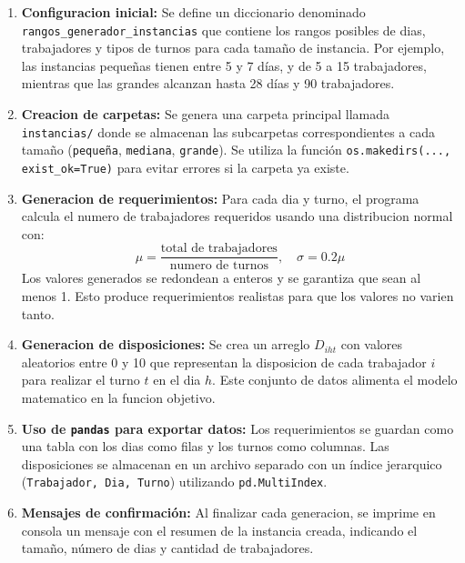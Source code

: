 \documentclass{article}
\begin{document}
\begin{enumerate}
    \item \textbf{Configuracion inicial:} 
    Se define un diccionario denominado \texttt{rangos\_generador\_instancias} que contiene los rangos posibles de dias, trabajadores y tipos de turnos para cada tamaño de instancia. 
    Por ejemplo, las instancias pequeñas tienen entre 5 y 7 días, y de 5 a 15 trabajadores, mientras que las grandes alcanzan hasta 28 días y 90 trabajadores.

    \item \textbf{Creacion de carpetas:}
    Se genera una carpeta principal llamada \texttt{instancias/} donde se almacenan las subcarpetas correspondientes a cada tamaño (\texttt{pequeña}, \texttt{mediana}, \texttt{grande}). 
    Se utiliza la función \texttt{os.makedirs(..., exist\_ok=True)} para evitar errores si la carpeta ya existe.

    \item \textbf{Generacion de requerimientos:}
    Para cada dia y turno, el programa calcula el numero de trabajadores requeridos usando una distribucion normal con:
    \[
    \mu = \frac{\text{total de trabajadores}}{\text{numero de turnos}}, \quad \sigma = 0.2\mu
    \]
    Los valores generados se redondean a enteros y se garantiza que sean al menos 1. 
    Esto produce requerimientos realistas para que los valores no varien tanto.

    \item \textbf{Generacion de disposiciones:}
    Se crea un arreglo  \(D_{iht}\) con valores aleatorios entre 0 y 10 que representan la disposicion de cada trabajador \(i\) para realizar el turno \(t\) en el dia \(h\). 
    Este conjunto de datos alimenta el modelo matematico en la funcion objetivo.

    \item \textbf{Uso de \texttt{pandas} para exportar datos:}
    Los requerimientos se guardan como una tabla con los dias como filas y los turnos como columnas.  
    Las disposiciones se almacenan en un archivo separado con un índice jerarquico (\texttt{Trabajador, Dia, Turno}) utilizando \texttt{pd.MultiIndex}.

    \item \textbf{Mensajes de confirmación:}
    Al finalizar cada generacion, se imprime en consola un mensaje con el resumen de la instancia creada, indicando el tamaño, número de dias y cantidad de trabajadores.
\end{enumerate}
\end{document}
